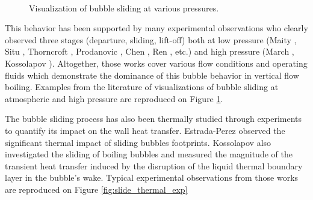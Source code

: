 \begin{figure}[H]

\begin{center}

\\

\end{center}

\caption{Visualization of bubble sliding at various pressures.}
\label{fig:slide_exp_vis}
\end{figure}


This behavior has been supported by many experimental observations who clearly observed three stages (departure, sliding, lift-off) both at low pressure (Maity \cite{maity_effect_2000}, Situ \cite{situ_bubble_2005}, Thorncroft \cite{thorncroft_experimental_1998}, Prodanovic \cite{prodanovic_bubble_2002}, Chen \cite{chen_prediction_2012}, Ren \cite{ren_development_2020}, etc.) and high pressure (March \cite{march_caracterisation_1999}, Kossolapov \cite{kossolapov_experimental_2021}). Altogether, those works cover various flow conditions and operating fluids which demonstrate the dominance of this bubble behavior in vertical flow boiling. Examples from the literature of visualizations of bubble sliding at atmospheric and high pressure are reproduced on Figure \ref{fig:slide_exp_vis}.

\npar

The bubble sliding process has also been thermally studied through experiments to quantify its impact on the wall heat transfer. Estrada-Perez \etal \cite{estrada-perez_time-resolved_2018} observed the significant thermal impact of sliding bubbles footprints. Kossolapov \cite{kossolapov_experimental_2021} also investigated the sliding of boiling bubbles and measured the magnitude of the transient heat transfer induced by the disruption of the liquid thermal boundary layer in the bubble's wake. Typical experimental observations from those works are reproduced on Figure \ref{fig:slide_thermal_exp}

